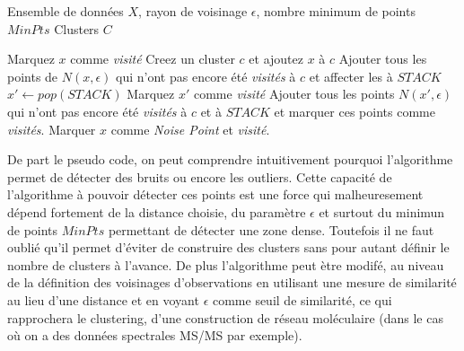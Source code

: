 \documentclass[12pt, french, latin.medieval, a4paper]{report}
\begin{document}
            \begin{algorithm}[H]
                \caption{Pseudo code de DBSCAN}
                \label{alg:dbscan}
                \begin{algorithmic}[1]
                \REQUIRE Ensemble de données $X$, rayon de voisinage $\epsilon$, nombre minimum de points $MinPts$
               \ENSURE Clusters $C$
                
                        \STATE Marquez $x$ comme  \textit{visité}
                        \STATE Creez un cluster $c$ et ajoutez $x$ à $c$
                        \STATE Ajouter tous les points de $N(x, \epsilon)$ qui n'ont pas encore été \textit{visités} à $c$ et affecter les à $STACK$
                            \STATE $x' \leftarrow pop(STACK)$
                                \STATE Marquez $x'$ comme \textit{visité}
                                \STATE Ajouter tous les points $N(x', \epsilon)$ qui n'ont pas encore été \textit{visités} à $c$ et à $STACK$ et marquer ces points comme \textit{visités}. 
                                \ENDIF
                            \ENDWHILE
                        \ELSE
                            \STATE Marquer $x$ comme \textit{Noise Point} et \textit{visité}.
                        \ENDIF
                \ENDFOR
                \end{algorithmic}
            \end{algorithm}
    
            De part le pseudo code, on peut comprendre intuitivement pourquoi l'algorithme permet de détecter des bruits ou encore les outliers. Cette capacité de l'algorithme à pouvoir détecter ces points est une force qui malheuresement dépend fortement de la distance choisie, du paramètre $\epsilon$ et surtout du minimun de points $MinPts$ permettant de détecter une zone dense. Toutefois il ne faut oublié qu'il permet d'éviter de construire des clusters sans pour autant définir le nombre de clusters à l'avance. De plus l'algorithme peut ètre modifé, au niveau de la définition des voisinages d'observations en utilisant une mesure de similarité au lieu d'une distance et en voyant $\epsilon$ comme seuil de similarité, ce qui rapprochera le clustering, d'une construction de réseau moléculaire (dans le cas où on a des données spectrales MS/MS par exemple).
                
\end{document}
